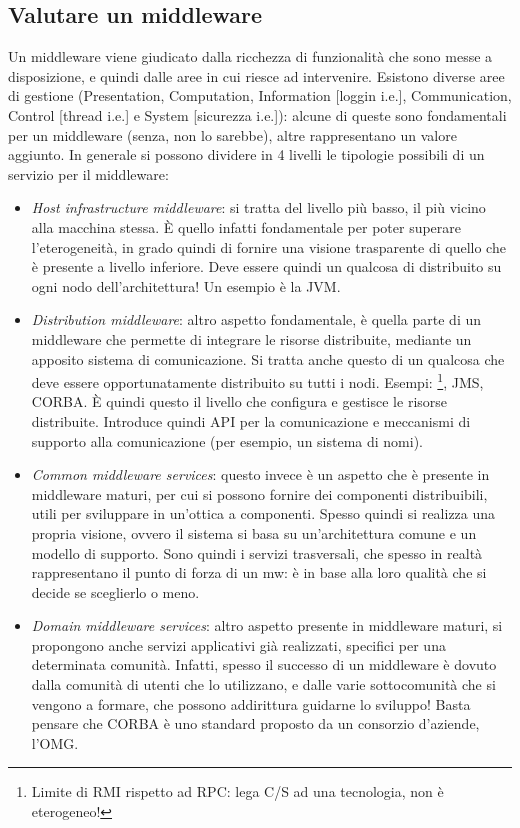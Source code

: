 \subsection{Valutare un middleware}
Un middleware viene giudicato dalla ricchezza di funzionalità che sono messe a disposizione, e quindi dalle aree in
cui riesce ad intervenire. Esistono diverse aree di gestione (Presentation, Computation, Information [loggin i.e.],
Communication, Control [thread i.e.] e System [sicurezza i.e.]): alcune di queste sono fondamentali per un middleware
(senza, non lo sarebbe), altre rappresentano un valore aggiunto.
In generale si possono dividere in 4 livelli le tipologie possibili di un servizio per il middleware:
\begin{itemize}
 \item \textit{Host infrastructure middleware}: si tratta del livello più basso, il più vicino alla macchina stessa.
 È quello infatti fondamentale per poter superare l'eterogeneità, in grado quindi di fornire una visione trasparente
 di quello che è presente a livello inferiore. Deve essere quindi un qualcosa di distribuito su ogni nodo
 dell'architettura! Un esempio è la JVM.
 \item \textit{Distribution middleware}: altro aspetto fondamentale, è quella parte di un middleware che permette di
 integrare le risorse distribuite, mediante un apposito sistema di comunicazione. Si tratta anche questo di un
 qualcosa che deve essere opportunatamente distribuito su tutti i nodi. Esempi: \footnote{Limite di RMI rispetto
 ad RPC: lega C/S ad una tecnologia, non è eterogeneo!}, JMS, CORBA. È quindi questo il livello che configura e
 gestisce le risorse distribuite. Introduce quindi API per la comunicazione e meccanismi  di supporto alla
 comunicazione (per esempio, un sistema di nomi).
 \item \textit{Common middleware services}: questo invece è un aspetto che è presente in middleware maturi, per cui si
 possono fornire dei componenti distribuibili, utili per sviluppare in un'ottica a componenti. Spesso quindi si realizza
 una propria visione, ovvero il sistema si basa su un'architettura comune e un modello di supporto. Sono quindi i
 servizi trasversali, che spesso in realtà rappresentano il punto di forza di un mw: è in base alla loro qualità
 che si decide se sceglierlo o meno.
 \item \textit{Domain middleware services}: altro aspetto presente in middleware maturi, si propongono anche servizi
 applicativi già realizzati, specifici per una determinata comunità. Infatti, spesso il successo di un middleware è
 dovuto dalla comunità di utenti che lo utilizzano, e dalle varie sottocomunità che si vengono a formare, che possono
 addirittura guidarne lo sviluppo! Basta pensare che CORBA è uno standard proposto da un consorzio d'aziende, l'OMG.
\end{itemize}

